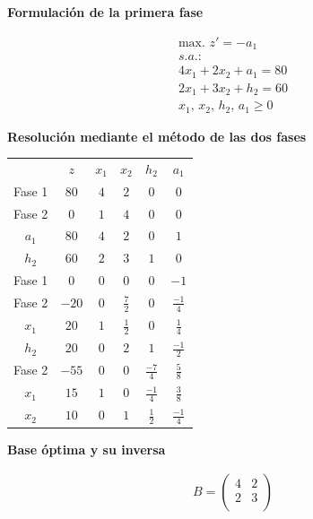 \textbf{Formulación de la primera fase}

\begin{equation}
\begin{split}
\mbox{max. } z' = -a_1\\
s.a.:\\
4x_1 + 2x_2 + a_1 = 80\\
2x_1 + 3x_2 + h_2 = 60\\
x_1,\,x_2,\,h_2,\,a_1\geq 0
\end{split}
\end{equation}

\textbf{Resolución mediante el método de las dos fases}

\begin{center}
\begin{tabular}{c|c|cccc|}
  & $z$ & $x_1$ & $x_2$ & $h_2$ & $a_1$\\
Fase 1 & $80$ & $4$ & $2$ & $0$ & $0$\\
Fase 2 & $0$ & $1$ & $4$ & $0$ & $0$\\
\hline
$a_1$ & $80$ & $4$ & $2$ & $0$ & $1$\\
$h_2$ & $60$ & $2$ & $3$ & $1$ & $0$\\
\hline
Fase 1 & $0$ & $0$ & $0$ & $0$ & $-1$\\
Fase 2 & $-20$ & $0$ & $\frac{7}{2}$ & $0$ & $\frac{-1}{4}$\\
\hline
$x_1$ & $20$ & $1$ & $\frac{1}{2}$ & $0$ & $\frac{1}{4}$\\
$h_2$ & $20$ & $0$ & $2$ & $1$ & $\frac{-1}{2}$\\
\hline
Fase 2 & $-55$ & $0$ & $0$ & $\frac{-7}{4}$ & $\frac{5}{8}$\\
\hline
$x_1$ & $15$ & $1$ & $0$ & $\frac{-1}{4}$ & $\frac{3}{8}$\\
$x_2$ & $10$ & $0$ & $1$ & $\frac{1}{2}$ & $\frac{-1}{4}$\\
\hline
\end{tabular}
\end{center}

\textbf{Base óptima y su inversa}

\begin{equation}
\begin{split}
B =\begin{pmatrix}
4 & 2\\
2 & 3\\
\end{pmatrix}
\end{split}
\end{equation}

